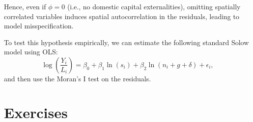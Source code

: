 \documentclass[english,12pt]{book}\usepackage[]{graphicx}\usepackage[]{xcolor}
\begin{document}
Hence, even if $\phi = 0$ (i.e., no domestic capital externalities), omitting spatially correlated variables induces spatial autocorrelation in the residuals, leading to model misspecification.

To test this hypothesis empirically, we can estimate the following standard Solow model using OLS:
\begin{equation*}
  \log\left(\frac{Y_i}{L_i}\right) = \beta_0 + \beta_1 \ln(s_i) + \beta_2 \ln(n_i + g  + \delta) + \epsilon_i,
\end{equation*}
%
and then use the Moran's I test on the residuals. 





\section{Exercises}
\end{document}

